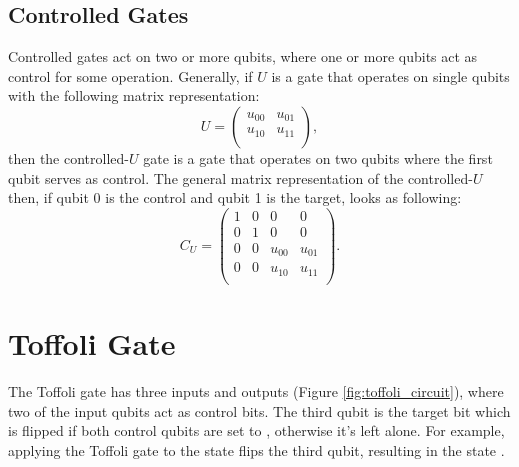 \documentclass[11pt, notitlepage]{report}
\begin{document}
\subsection{Controlled Gates}
Controlled gates act on two or more qubits, where one or more qubits act as control for some operation. Generally, if $U$ is a gate that operates on single qubits with the following matrix representation:
\begin{equation}
  U =
  \begin{pmatrix}
  u_{00} & u_{01} \\
  u_{10} & u_{11} \\
  \end{pmatrix},
\end{equation}
then the controlled-$U$ gate is a gate that operates on two qubits where the first qubit serves as control. The general matrix representation of the controlled-$U$ then, if qubit 0 is the control and qubit 1 is the target, looks as following:
\begin{equation}
  C_U =
  \begin{pmatrix}
  1 & 0 & 0 & 0 \\
  0 & 1 & 0 & 0 \\
  0 & 0 & u_{00} & u_{01} \\
  0 & 0 & u_{10} & u_{11} \\
  \end{pmatrix}.
\end{equation}
\section{Toffoli Gate}
The Toffoli gate has three inputs and outputs (Figure \ref{fig:toffoli_circuit}), where two of the input qubits act as control bits. The third qubit is the target bit which is flipped if both control qubits are set to , otherwise it's left alone. For example, applying the Toffoli gate to the state  flips the third qubit, resulting in the state .
\end{document}
